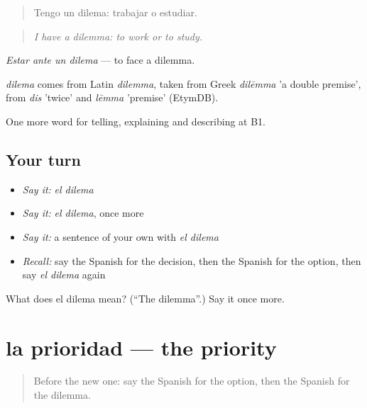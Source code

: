\begin{quote}
Tengo un dilema: trabajar o estudiar.
\end{quote}

\begin{quote}
\emph{I have a dilemma: to work or to study.}
\end{quote}

\emph{Estar ante un dilema} — to face a dilemma.

\begin{cousinweb}
\emph{dilema} comes from Latin \emph{dilemma}, taken from Greek \emph{dilēmma} 'a double premise', from \emph{dis} 'twice' and \emph{lēmma} 'premise' (EtymDB).
\end{cousinweb}

\begin{grammarlens}[title={What you've built}]
One more word for telling, explaining and describing at B1.
\end{grammarlens}

\subsection*{Your turn}
\begin{itemize}
\raggedright
  \item \emph{Say it:} \emph{el dilema}
  \item \emph{Say it:} \emph{el dilema}, once more
  \item \emph{Say it:} a sentence of your own with \emph{el dilema}
  \item \emph{Recall:} say the Spanish for the decision, then the Spanish for the option, then say \emph{el dilema} again
\end{itemize}

\begin{tcolorbox}[breakable,colback=teal!4,colframe=teal!35!black,title={Before you move on}]
What does el dilema mean? (\textquotedblleft{}The dilemma\textquotedblright{}.) Say it once more.
\end{tcolorbox}
\section[la prioridad]{la prioridad — the priority}

\label{lesson:ES-C617-prioridad}



\begin{quote}
Before the new one: say the Spanish for the option, then the Spanish for the dilemma.
\end{quote}


